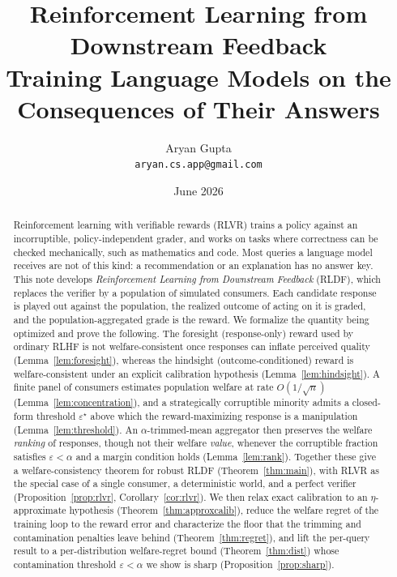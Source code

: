 \documentclass[11pt]{article}
\title{\textbf{Reinforcement Learning from Downstream Feedback}\\[4pt]
{\large Training Language Models on the Consequences of Their Answers}}
\author{Aryan Gupta\\[2pt]\small\texttt{aryan.cs.app@gmail.com}}
\date{June 2026}
\theoremstyle{plain}
\theoremstyle{definition}
\theoremstyle{remark}
\newcommand{\eps}{\varepsilon}
\begin{document}
\maketitle

\begin{abstract}
\noindent
Reinforcement learning with verifiable rewards (RLVR) trains a policy against an incorruptible,
policy-independent grader, and works on tasks where correctness can be checked mechanically,
such as mathematics and code. Most queries a language model receives are not of this kind: a
recommendation or an explanation has no answer key. This note develops \emph{Reinforcement
Learning from Downstream Feedback} (RLDF), which replaces the verifier by a population of
simulated consumers. Each candidate response is played out against the population, the realized
outcome of acting on it is graded, and the population-aggregated grade is the reward. We
formalize the quantity being optimized and prove the following. The foresight (response-only)
reward used by ordinary RLHF is not welfare-consistent once responses can inflate perceived
quality (Lemma~\ref{lem:foresight}), whereas the hindsight (outcome-conditioned) reward is
welfare-consistent under an explicit calibration hypothesis (Lemma~\ref{lem:hindsight}). A
finite panel of consumers estimates population welfare at rate $O(1/\sqrt n)$
(Lemma~\ref{lem:concentration}), and a strategically corruptible minority admits a closed-form
threshold $\eps^\star$ above which the reward-maximizing response is a manipulation
(Lemma~\ref{lem:threshold}). An $\alpha$-trimmed-mean aggregator then preserves the welfare
\emph{ranking} of responses, though not their welfare \emph{value}, whenever the corruptible
fraction satisfies $\eps<\alpha$ and a margin condition holds (Lemma~\ref{lem:rank}). Together
these give a welfare-consistency theorem for robust RLDF (Theorem~\ref{thm:main}), with RLVR as
the special case of a single consumer, a deterministic world, and a perfect verifier
(Proposition~\ref{prop:rlvr}, Corollary~\ref{cor:rlvr}). We then relax exact calibration to an
$\eta$-approximate hypothesis (Theorem~\ref{thm:approxcalib}), reduce the welfare regret of the
training loop to the reward error and characterize the floor that the trimming and
contamination penalties leave behind (Theorem~\ref{thm:regret}), and lift the per-query result to
a per-distribution welfare-regret bound (Theorem~\ref{thm:dist}) whose contamination threshold
$\eps<\alpha$ we show is sharp (Proposition~\ref{prop:sharp}).
\end{abstract}
\end{document}
